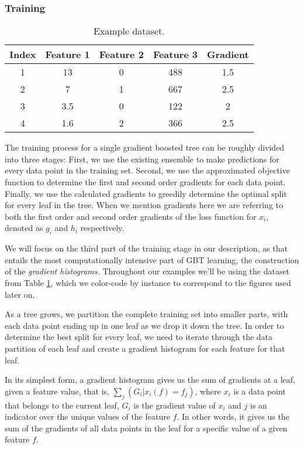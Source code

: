 \subsubsection*{Training}

\begin{table}
	\centering
	\begin{tabular}{cccc|c}
		\toprule
		Index & Feature 1 & Feature 2 & Feature 3 & Gradient \\
		\midrule
		\rowcolor{CBOne}
		1 & 13 & 0 & 488 & 1.5 \\
		\rowcolor{CBTwo}
		2 & 7 & 1 & 667 & 2.5 \\
		\rowcolor{CBThree}
		3 & 3.5 & 0 & 122 & 2 \\
		\rowcolor{CBFour}
		4 & 1.6 & 2 & 366 & 2.5 \\
		\bottomrule
	\end{tabular}
	\caption{Example dataset.}
	\label{tab:example-data}
\end{table}


The training process for a single gradient boosted tree can be roughly divided into three stages:
First, we use the existing ensemble to make predictions for every data point in the training
set. Second, we use the approximated objective function to determine the first and second order
gradients for each data point. Finally, we use the calculated gradients to greedily determine
the optimal split for every leaf in the tree. When we mention gradients here we are referring
to both the first order and second order gradients of the loss function for $x_i$, denoted as $g_i$ and $h_i$
respectively.

We will focus on the third part of the training stage in our description, as that entails the most
computationally intensive part of GBT learning, the construction of the \emph{gradient histograms.}
Throughout our examples we'll be using the dataset from Table \ref{tab:example-data},
which we color-code by instance to correspond to the figures used later on.

As a tree grows, we partition the complete training set into smaller parts, with each data
point ending up in one leaf as we drop it down the tree.
In order to determine the best split for every leaf, we need to iterate through the data
partition of each leaf and create a gradient histogram for each feature for that leaf.

In its simplest form, a gradient histogram gives us the sum of gradients at a leaf,
given a feature value, that is, $\sum_{j}(G_i | x_i(f) = f_j)$, where $x_i$ is a data point
that belongs to the current leaf,  $G_i$ is the gradient value of $x_i$ and $j$ is an
indicator over the unique values of the feature $f$. In other words, it gives us the
sum of the gradients of all data points in the leaf for a specific value of a given
feature $f$.

